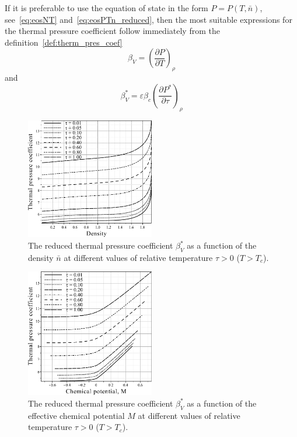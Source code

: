 \documentclass[12pt]{article}
\begin{document}
	If it is preferable to use the equation of state in the form $P=P(T, \bar{n})$, see~\eqref{eq:eosNT} and~\eqref{eq:eosPTn_reduced}, then the most suitable expressions for the thermal pressure coefficient follow immediately from the definition~\eqref{def:therm_pres_coef}
	\begin{equation}
		\beta_V = \left(\frac{\partial P}{\partial T}\right)_\rho
	\end{equation}
	and
	\begin{equation}
		\beta^*_V = \varepsilon\beta_c \left(\frac{\partial P^*}{\partial \tau}\right)_{\rho}
	\end{equation}
	
	
	\begin{figure}[h!]
		\centering \includegraphics[width=0.5\textwidth]{f3a.pdf}
		\vskip-3mm\caption{The reduced thermal pressure coefficient $\beta^*_V$ as a function of the density $\bar n$ at different values of relative temperature $\tau > 0$ ($T > T_c$). 
		}\label{fig3a}
	\end{figure}
	\begin{figure}[h!]
		\centering \includegraphics[width=0.5\textwidth]{f3b.pdf}
		\vskip-3mm\caption{The reduced thermal pressure coefficient $\beta^*_V$ as a function of the effective chemical potential $M$ at different values of relative temperature $\tau > 0$ ($T > T_c$). 
		}\label{fig3b}
	\end{figure}
\end{document}
